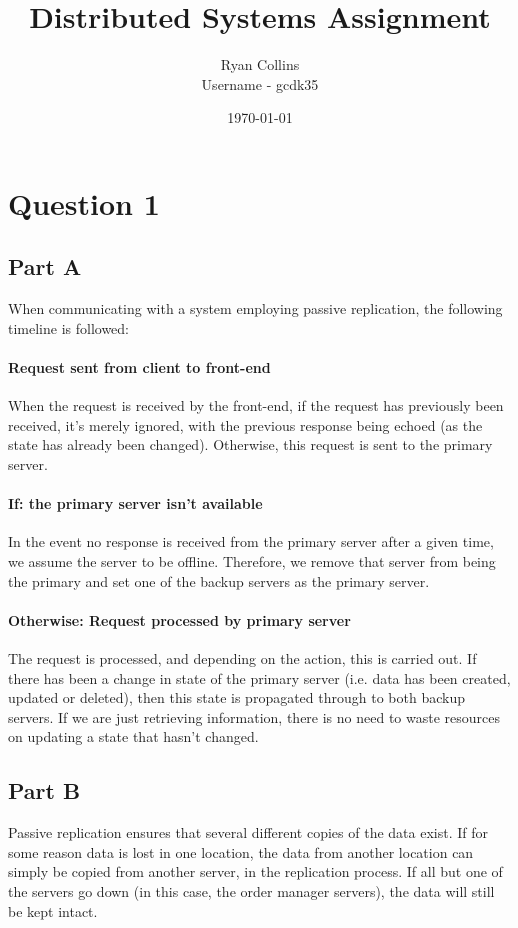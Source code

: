 \documentclass[12pt,fleqn,leqno,letterpaper]{article}
\title{Distributed Systems Assignment}
\author{Ryan Collins\\
  \small{Username - gcdk35}\\
}
\date{\today}
\begin{document}
\maketitle

\section*{Question 1}
\subsection*{Part A}
When communicating with a system employing passive replication, the following timeline is followed:

\paragraph{Request sent from client to front-end}
When the request is received by the front-end, if the request has previously been received, it's merely ignored, with the previous response being echoed (as the state has already been changed). Otherwise, this request is sent to the primary server.

\paragraph{If: the primary server isn't available}
In the event no response is received from the primary server after a given time, we assume the server to be offline.
Therefore, we remove that server from being the primary and set one of the backup servers as the primary server.

\paragraph{Otherwise: Request processed by primary server}
    The request is processed, and depending on the action, this is carried out. If there has been a change in state of the
    primary server (i.e. data has been created, updated or deleted), then this state is propagated through to both backup
    servers. If we are just retrieving information, there is no need to waste resources on updating a state that hasn't
    changed.

\subsection*{Part B}
Passive replication ensures that several different copies of the data exist. If for some reason data is lost in one location, the data from another location can simply be copied
from another server, in the replication process. If all but one of the servers go down (in this case, the order manager servers), the data will still be kept intact.
\end{document}
